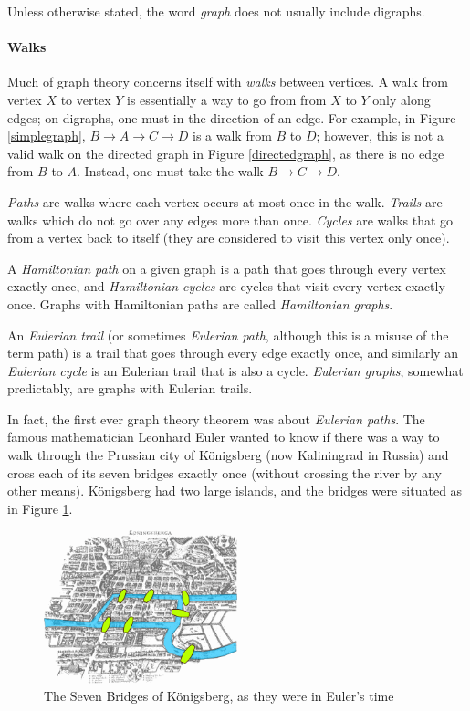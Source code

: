 \documentclass[11pt,a4paper]{report}
\begin{document}
\begin{adjustwidth}{5cm}{5cm}
Unless otherwise stated, the word \textit{graph} does not usually include digraphs.

\paragraph{Walks}

Much of graph theory concerns itself with \textit{walks} between vertices. A walk from vertex \(X\) to vertex \(Y\) is essentially a way to go from from \(X\) to \(Y\)  only along edges; on digraphs, one must  in the direction of an edge. For example, in Figure \ref{simplegraph}, \(B \rightarrow A \rightarrow C \rightarrow D\) is a walk from \(B\) to \(D\); however, this is not a valid walk on the directed graph in Figure \ref{directedgraph}, as there is no edge from \(B\) to \(A\). Instead, one must take the walk \(B \rightarrow C \rightarrow D\).

\textit{Paths} are walks where each vertex occurs at most once in the walk. \textit{Trails} are walks which do not go over any edges more than once. \textit{Cycles} are walks that go from a vertex back to itself (they are considered to visit this vertex only once).

A \textit{Hamiltonian path} on a given graph is a path that goes through every vertex exactly once, and \textit{Hamiltonian cycles} are cycles that visit every vertex exactly once. Graphs with Hamiltonian paths are called \textit{Hamiltonian graphs}.

An \textit{Eulerian trail} (or sometimes \textit{Eulerian path}, although this is a misuse of the term path) is a trail that goes through every edge exactly once, and similarly an \textit{Eulerian cycle} is an Eulerian trail that is also a cycle. \textit{Eulerian graphs}, somewhat predictably, are graphs with Eulerian trails.

In fact, the first ever graph theory theorem was about \textit{Eulerian paths}. The famous mathematician Leonhard Euler wanted to know if there was a way to walk through the Prussian city of K\"onigsberg (now Kaliningrad in Russia) and cross each of its seven bridges exactly once (without crossing the river by any other means). K\"onigsberg had two large islands, and the bridges were situated as in Figure \ref{Konigsberg}.

\begin{figure}[h]
	\centering
	\includegraphics[width=0.5\textwidth]{Konigsberg}
	\caption{The Seven Bridges of K\"onigsberg, as they were in Euler's time}
	\label{Konigsberg}
\end{figure}


\end{adjustwidth}
\end{document}
